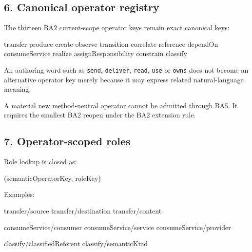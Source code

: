 \documentclass[
  10pt,
  a4paper,
]{article}
\newenvironment{Shaded}{}{}
\newcommand{\NormalTok}[1]{#1}
\begin{document}
\subsection{6. Canonical operator
registry}\label{6-canonical-operator-registry}

The thirteen BA2 current-scope operator keys remain exact canonical
keys:

\begin{Shaded}
\begin{Highlighting}[]
\NormalTok{transfer}
\NormalTok{produce}
\NormalTok{create}
\NormalTok{observe}
\NormalTok{transition}
\NormalTok{correlate}
\NormalTok{reference}
\NormalTok{dependOn}
\NormalTok{consumeService}
\NormalTok{realize}
\NormalTok{assignResponsibility}
\NormalTok{constrain}
\NormalTok{classify}
\end{Highlighting}
\end{Shaded}

An authoring word such as \texttt{send}, \texttt{deliver},
\texttt{read}, \texttt{use} or \texttt{owns} does not become an
alternative operator key merely because it may express related
natural-language meaning.

A material new method-neutral operator cannot be admitted through BA5.
It requires the smallest BA2 reopen under the BA2 extension rule.

\subsection{7. Operator-scoped roles}\label{7-operator-scoped-roles}

Role lookup is closed as:

\begin{Shaded}
\begin{Highlighting}[]
\NormalTok{(semanticOperatorKey, roleKey)}
\end{Highlighting}
\end{Shaded}

Examples:

\begin{Shaded}
\begin{Highlighting}[]
\NormalTok{transfer/source}
\NormalTok{transfer/destination}
\NormalTok{transfer/content}

\NormalTok{consumeService/consumer}
\NormalTok{consumeService/service}
\NormalTok{consumeService/provider}

\NormalTok{classify/classifiedReferent}
\NormalTok{classify/semanticKind}
\end{Highlighting}
\end{Shaded}
\end{document}
